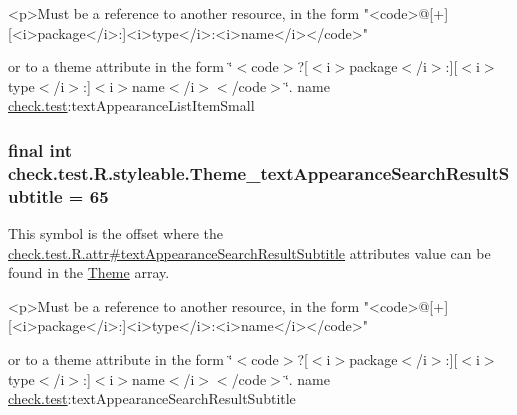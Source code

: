 \begin{DoxyVerb}      <p>Must be a reference to another resource, in the form "<code>@[+][<i>package</i>:]<i>type</i>:<i>name</i></code>"
\end{DoxyVerb}
 or to a theme attribute in the form \char`\"{}$<$code$>$?\mbox{[}$<$i$>$package$<$/i$>$\+:\mbox{]}\mbox{[}$<$i$>$type$<$/i$>$\+:\mbox{]}$<$i$>$name$<$/i$>$$<$/code$>$\char`\"{}.  name \hyperlink{namespacecheck_1_1test}{check.\+test}\+:text\+Appearance\+List\+Item\+Small \hypertarget{classcheck_1_1test_1_1_r_1_1styleable_a1d39c6b5da48087c8f55a027e4050139}{}
\subsubsection[{Theme\+\_\+text\+Appearance\+Search\+Result\+Subtitle}]{\setlength{\rightskip}{0pt plus 5cm}final int check.\+test.\+R.\+styleable.\+Theme\+\_\+text\+Appearance\+Search\+Result\+Subtitle = 65\hspace{0.3cm}{\ttfamily [static]}}\label{classcheck_1_1test_1_1_r_1_1styleable_a1d39c6b5da48087c8f55a027e4050139}
This symbol is the offset where the \hyperlink{classcheck_1_1test_1_1_r_1_1attr_add36b7b3af37d5ad8320ceb443d2dd2f}{check.\+test.\+R.\+attr\#text\+Appearance\+Search\+Result\+Subtitle} attribute\textquotesingle{}s value can be found in the \hyperlink{classcheck_1_1test_1_1_r_1_1styleable_acca726d02016a0cf607782ec3a436a81}{Theme} array.

\begin{DoxyVerb}      <p>Must be a reference to another resource, in the form "<code>@[+][<i>package</i>:]<i>type</i>:<i>name</i></code>"
\end{DoxyVerb}
 or to a theme attribute in the form \char`\"{}$<$code$>$?\mbox{[}$<$i$>$package$<$/i$>$\+:\mbox{]}\mbox{[}$<$i$>$type$<$/i$>$\+:\mbox{]}$<$i$>$name$<$/i$>$$<$/code$>$\char`\"{}.  name \hyperlink{namespacecheck_1_1test}{check.\+test}\+:text\+Appearance\+Search\+Result\+Subtitle \hypertarget{classcheck_1_1test_1_1_r_1_1styleable_aad7da0b4a2302f6cd5981784f6507c2d}{}
